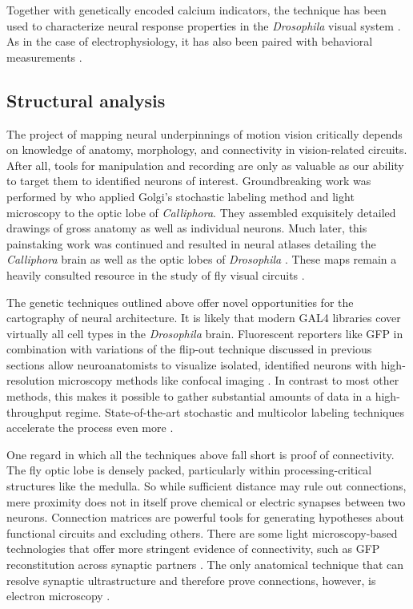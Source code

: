 Together with genetically encoded calcium indicators, the technique has been used to characterize neural response properties in the \textit{Drosophila} visual system \citep{Reiff:2010eo,Clark:2011gw}. As in the case of electrophysiology, it has also been paired with behavioral measurements \citep{Seelig:2010aa,Seelig:2013in}.

\subsection{Structural analysis}

The project of mapping neural underpinnings of motion vision critically depends on knowledge of anatomy, morphology, and connectivity in vision-related circuits. After all, tools for manipulation and recording are only as valuable as our ability to target them to identified neurons of interest. Groundbreaking work was performed by \citet{Cajal:1915aa} who applied Golgi's stochastic labeling method and light microscopy to the optic lobe of \textit{Calliphora}. They assembled exquisitely detailed drawings of gross anatomy as well as individual neurons. Much later, this painstaking work was continued and resulted in neural atlases detailing the \textit{Calliphora} brain \citep{Strausfeld:1976aa} as well as the optic lobes of \textit{Drosophila} \citep{Fischbach:1989uw,Bausenwein:1992vx}. These maps remain a heavily consulted resource in the study of fly visual circuits \citep[see also recent efforts regarding nomenclature by][]{Ito:2014aa}.

The genetic techniques outlined above offer novel opportunities for the cartography of neural architecture. It is likely that modern GAL4 libraries cover virtually all cell types in the \textit{Drosophila} brain. Fluorescent reporters like GFP in combination with variations of the flip-out technique discussed in previous sections allow neuroanatomists to visualize isolated, identified neurons with high-resolution microscopy methods like confocal imaging \citep{Minsky:1988aa,Venken:2011hf}. In contrast to most other methods, this makes it possible to gather substantial amounts of data in a high-throughput regime. State-of-the-art stochastic and multicolor labeling techniques accelerate the process even more \citep{Hampel:2011aa,Hadijeconomou:2011aa,Raghu:2011iy,Nern:2015aa,Mauss:2015kj}.

One regard in which all the techniques above fall short is proof of connectivity. The fly optic lobe is densely packed, particularly within processing-critical structures like the medulla. So while sufficient distance may rule out connections, mere proximity does not in itself prove chemical or electric synapses between two neurons. Connection matrices are powerful tools for generating hypotheses about functional circuits and excluding others. There are some light microscopy-based technologies that offer more stringent evidence of connectivity, such as GFP reconstitution across synaptic partners \citep[GRASP;][]{Feinberg:2008aa}. The only anatomical technique that can resolve synaptic ultrastructure and therefore prove connections, however, is electron microscopy \citep{Knoll:1932aa}.

